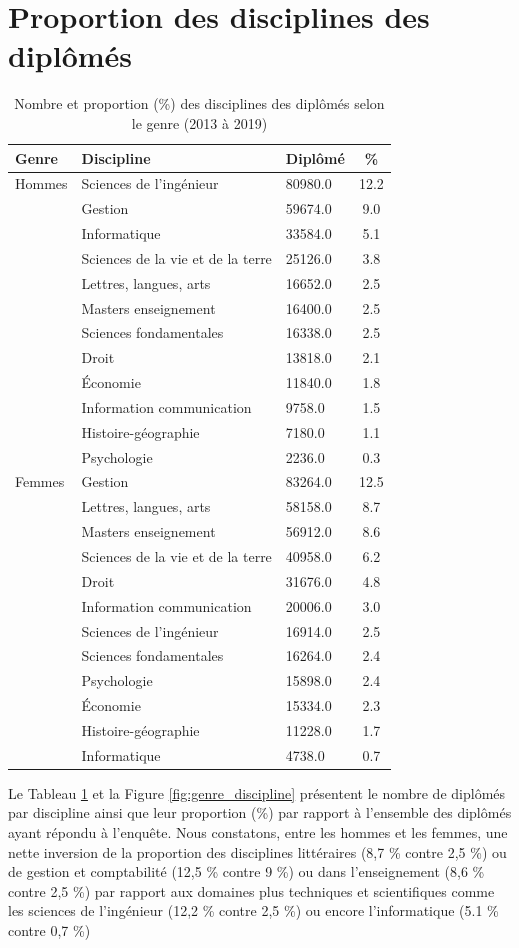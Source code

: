 \documentclass[12pt, a4paper, titlepage, table]{article}
\begin{document}
\section{Proportion des disciplines des diplômés}
	\begin{table}[H]
		\centering
		\begin{tabular}{lllc}
			\toprule
			\textbf{Genre} & \textbf{Discipline} & \textbf{Diplômé} & \textbf{\%} \\
			\midrule
			Hommes & Sciences de l'ingénieur & 80980.0 & 12.2 \\
			& Gestion & 59674.0 & 9.0 \\
			& Informatique & 33584.0 & 5.1 \\
			& Sciences de la vie et de la terre & 25126.0 & 3.8 \\
			& Lettres, langues, arts & 16652.0 & 2.5 \\
			& Masters enseignement & 16400.0 & 2.5 \\
			& Sciences fondamentales & 16338.0 & 2.5 \\
			& Droit & 13818.0 & 2.1 \\
			& Économie & 11840.0 & 1.8 \\
			& Information communication & 9758.0 & 1.5 \\
			& Histoire-géographie & 7180.0 & 1.1 \\
			& Psychologie & 2236.0 & 0.3 \\
			\midrule
			Femmes & Gestion & 83264.0 & 12.5 \\
			& Lettres, langues, arts & 58158.0 & 8.7 \\
			& Masters enseignement & 56912.0 & 8.6 \\
			& Sciences de la vie et de la terre & 40958.0 & 6.2 \\
			& Droit & 31676.0 & 4.8 \\
			& Information communication & 20006.0 & 3.0 \\
			& Sciences de l'ingénieur & 16914.0 & 2.5 \\
			& Sciences fondamentales & 16264.0 & 2.4 \\
			& Psychologie & 15898.0 & 2.4 \\
			& Économie & 15334.0 & 2.3 \\
			& Histoire-géographie & 11228.0 & 1.7 \\
			& Informatique & 4738.0 & 0.7 \\
			\bottomrule
		\end{tabular}
		\caption{Nombre et proportion (\%) des disciplines des diplômés selon le genre (2013 à 2019)}
		\label{tab:genre_discipline}
	\end{table}
	Le Tableau \ref{tab:genre_discipline} et la Figure \ref{fig:genre_discipline} présentent le nombre de diplômés par discipline ainsi que leur proportion (\%) par rapport à l'ensemble des diplômés ayant répondu à l'enquête.
	Nous constatons, entre les hommes et les femmes,  une nette inversion de la proportion des disciplines  littéraires (8,7 \% contre 2,5 \%) ou de gestion et comptabilité (12,5 \% contre 9 \%) ou dans l'enseignement (8,6 \% contre 2,5 \%) par rapport aux domaines plus techniques et scientifiques comme les sciences de l'ingénieur (12,2 \% contre 2,5 \%) ou encore l'informatique (5.1 \% contre 0,7 \%)
\end{document}
